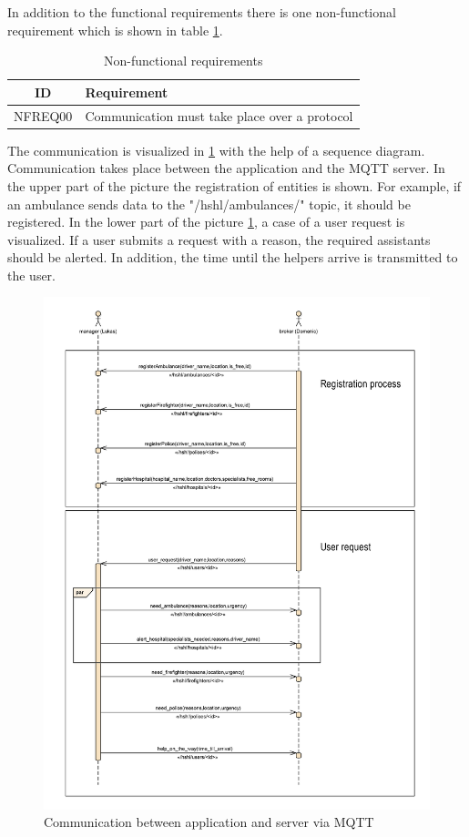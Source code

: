 In addition to the functional requirements there is one non-functional requirement which is shown in table \ref{nfr}.

\begin{table}[h]
    \centering
    \begin{tabular}{c|l}
    ID & Requirement  \\
    \hline
    NFREQ00 & Communication must take place over a protocol \\

    \end{tabular}
    \caption{Non-functional requirements}
    \label{nfr}
\end{table}

The communication is visualized in \ref{SEQ} with the help of a sequence diagram. Communication takes place between the application and the MQTT server. In the upper part of the picture the registration of entities is shown. For example, if an ambulance sends data to the "/hshl/ambulances/" topic, it should be registered. In the lower part of the picture \ref{SEQ}, a case of a user request is visualized. If a user submits a request with a reason, the required assistants should be alerted. In addition, the time until the helpers arrive is transmitted to the user.

\begin{figure}
\sidecaption
\includegraphics[scale=0.6]{images/walter/sequence_png.png}
\caption{Communication between application and server via MQTT}
\label{SEQ}
\end{figure}



